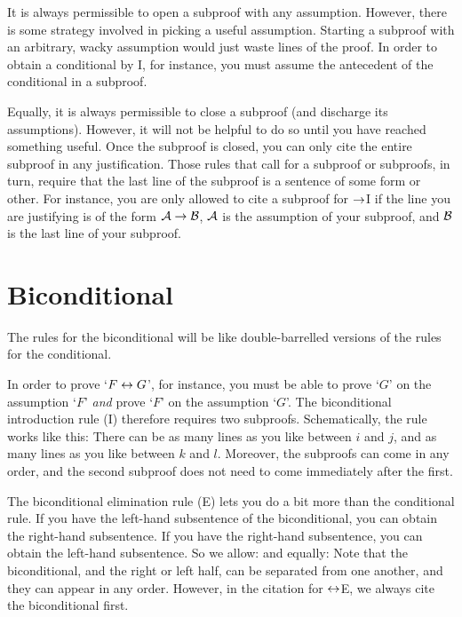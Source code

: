 It is always permissible to open a subproof with any assumption. However, there is some strategy involved in picking a useful assumption. Starting a subproof with an arbitrary, wacky assumption would just waste lines of the proof. In order to obtain a conditional by {\eif}I, for instance, you must assume the antecedent of the conditional in a subproof. 

Equally, it is always permissible to close a subproof (and discharge its assumptions). However, it will not be helpful to do so until you have reached something useful. Once the subproof is closed, you can only cite the entire subproof in any justification. Those rules that call for a subproof or subproofs, in turn, require that the last line of the subproof is a sentence of some form or other. For instance, you are only allowed to cite a subproof for $\rightarrow$I if the line you are justifying is of the form $\mathcal{A} \rightarrow \mathcal{B}$, $\mathcal{A}$ is the assumption of your subproof, and $\mathcal{B}$ is the last line of your subproof.


\section{Biconditional}
The rules for the biconditional will be like double-barrelled versions of the rules for the conditional.

In order to prove `$F \leftrightarrow G$', for instance, you must be able to prove `$G$' on the assumption `$F$' \emph{and} prove `$F$' on the assumption `$G$'. The biconditional introduction rule ({\eiff}I) therefore requires two subproofs. Schematically, the rule works like this: 
There can be as many lines as you like between $i$ and $j$, and as many lines as you like between $k$ and $l$. Moreover, the subproofs can come in any order, and the second subproof does not need to come immediately after the first.

The biconditional elimination rule ({\eiff}E) lets you do a bit more than the conditional rule. If you have the left-hand subsentence of the biconditional, you can obtain the right-hand subsentence. If you have the right-hand subsentence, you can obtain the left-hand subsentence. So we allow:
and equally:
Note that the biconditional, and the right or left half, can be separated from one another, and they can appear in any order. However, in the citation for $\leftrightarrow$E, we always cite the biconditional first.

